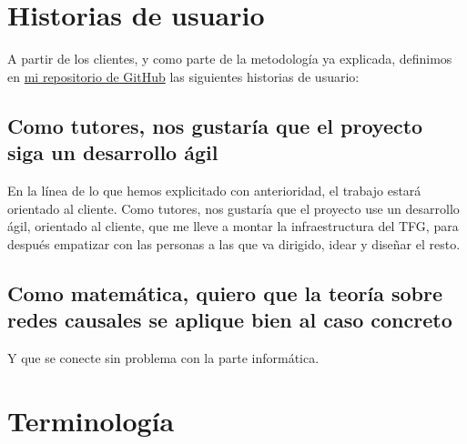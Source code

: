 \section{Historias de usuario}  

A partir de los clientes, y como parte de la metodología ya explicada, definimos en \href{https://github.com/ElenaMerelo/TFG}{mi repositorio 
de GitHub} las siguientes historias de usuario: 

\subsection{Como tutores, nos gustaría que el proyecto siga un desarrollo ágil}

En la línea de lo que hemos explicitado con anterioridad, el trabajo estará orientado 
al cliente.
Como tutores, nos gustaría que el proyecto use un desarrollo ágil, orientado al cliente, 
que me lleve a montar la infraestructura del TFG, para después empatizar con las personas 
a las que va dirigido, idear y diseñar el resto.

\subsection*{Como matemática, quiero que la teoría sobre redes causales se aplique bien al caso concreto}

Y que se conecte sin problema con la parte informática.


\section{Terminología}
